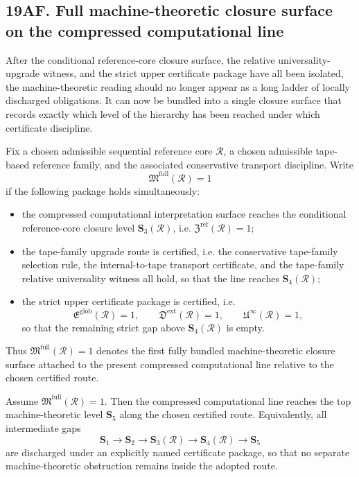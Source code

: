 \subsection*{19AF. Full machine-theoretic closure surface on the compressed computational line}
After the conditional reference-core closure surface, the relative universality-upgrade witness, and the strict upper certificate package have all been isolated, the machine-theoretic reading should no longer appear as a long ladder of locally discharged obligations. It can now be bundled into a single closure surface that records exactly which level of the hierarchy has been reached under which certificate discipline.

\begin{definition}
Fix a chosen admissible sequential reference core \(\mathcal R\), a chosen admissible tape-based reference family, and the associated conservative transport discipline. Write
\[
\mathfrak M^{\mathrm{full}}(\mathcal R)=1
\]
if the following package holds simultaneously:
\begin{itemize}[leftmargin=2em]
  \item the compressed computational interpretation surface reaches the conditional reference-core closure level \(\mathbf S_3(\mathcal R)\), i.e. \(\mathfrak Z^{\mathrm{ref}}(\mathcal R)=1\);
  \item the tape-family upgrade route is certified, i.e. the conservative tape-family selection rule, the internal-to-tape transport certificate, and the tape-family relative universality witness all hold, so that the line reaches \(\mathbf S_4(\mathcal R)\);
  \item the strict upper certificate package is certified, i.e.
  \[
  \mathfrak E^{\mathrm{glob}}(\mathcal R)=1,\qquad
  \mathfrak D^{\mathrm{ext}}(\mathcal R)=1,\qquad
  \mathfrak U^{\infty}(\mathcal R)=1,
  \]
  so that the remaining strict gap above \(\mathbf S_4(\mathcal R)\) is empty.
\end{itemize}
Thus \(\mathfrak M^{\mathrm{full}}(\mathcal R)=1\) denotes the first fully bundled machine-theoretic closure surface attached to the present compressed computational line relative to the chosen certified route.
\end{definition}

\begin{theorem}
Assume \(\mathfrak M^{\mathrm{full}}(\mathcal R)=1\). Then the compressed computational line reaches the top machine-theoretic level \(\mathbf S_5\) along the chosen certified route. Equivalently, all intermediate gaps
\[
\mathbf S_1\longrightarrow \mathbf S_2\longrightarrow \mathbf S_3(\mathcal R)\longrightarrow \mathbf S_4(\mathcal R)\longrightarrow \mathbf S_5
\]
are discharged under an explicitly named certificate package, so that no separate machine-theoretic obstruction remains inside the adopted route.
\end{theorem}

